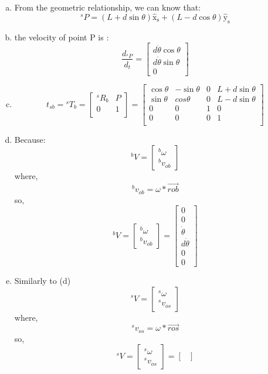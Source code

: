 \begin{enumerate}[(a)]
    \item 
    From the geometric relationship, we can know that: \[{}^sP=(L+d \sin \theta) \hat{\mathrm{x}}_{\mathrm{s}}+(L-d \cos \theta) \hat{\mathrm{y}}_{\mathrm{s}} \]
    \item 
    the velocity of point P is : \[\frac{d_{{}^sP}}{d_t} = \begin{bmatrix}
        d\dot{\theta}\cos\theta\\ d\dot{\theta}\sin\theta \\ 0
    \end{bmatrix}\]
    \item 
    \[t_{sb} = {}^sT_b = \begin{bmatrix}
        {}^sR_b & P \\
        0 & 1\\
    \end{bmatrix} =
    \begin{bmatrix}
        \cos\theta & -\sin\theta & 0 & L+d\sin\theta \\
        \sin\theta & cos\theta & 0 & L-d\sin\theta \\
        0 & 0 & 1 & 0 \\
        0 & 0 & 0 & 1\\
    \end{bmatrix}\]
    \item 
    Because: 
    \[^bV = \begin{bmatrix}
        ^b\omega\\^bv_{ob}
    \end{bmatrix} \]
    where, \[^bv_{ob} = \omega * \overrightarrow{rob}\]
    so, \[^bV = \begin{bmatrix}^b\omega\\^bv_{ob}\end{bmatrix} = \begin{bmatrix}
    0 \\ 0 \\ \dot{\theta} \\ d\dot{\theta} \\ 0 \\ 0
    \end{bmatrix}\]
    \item 
    Similarly to (d) \[^sV = \begin{bmatrix}
    ^s\omega\\^sv_{os}
    \end{bmatrix} \]
    where, \[^sv_{os} = \omega * \overrightarrow{ros}\]
    so, \[^sV = \begin{bmatrix}^s\omega\\^sv_{os}\end{bmatrix} = \begin{bmatrix}

\end{bmatrix}\]
\end{enumerate}
